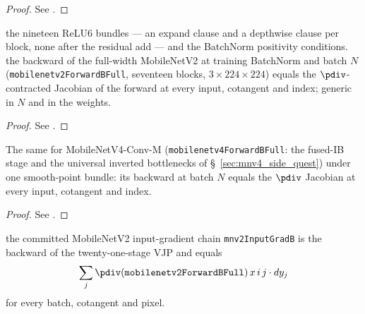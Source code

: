 \begin{proof}
\leanok
See .
\end{proof}

\begin{theorem}
  \label{thm:mobilenetv2FullHasVJP}
  \leanok
  \Assume{} the nineteen ReLU6 bundles --- an expand clause and a depthwise
  clause per block, none after the residual add --- and the BatchNorm
  positivity conditions. \Prove{} the backward of the full-width MobileNetV2
  at training BatchNorm and batch \(N\) (\texttt{mobilenetv2ForwardBFull},
  seventeen blocks, \(3 \times 224 \times 224\)) equals the
  \(\pdiv\)-contracted Jacobian of the forward at every input, cotangent and
  index; generic in \(N\) and in the weights.
\end{theorem}

\begin{proof}
\leanok
See .
\end{proof}

\begin{theorem}
  \label{thm:mobilenetv4FullHasVJP}
  \leanok
  The same for MobileNetV4-Conv-M (\texttt{mobilenetv4ForwardBFull}: the
  fused-IB stage and the universal inverted bottlenecks of
  \S~\ref{sec:mnv4_side_quest}) under one smooth-point bundle: \Prove{} its
  backward at batch \(N\) equals the \(\pdiv\) Jacobian at every input,
  cotangent and index.
\end{theorem}

\begin{proof}
\leanok
See .
\end{proof}

\begin{theorem}
  \label{thm:mobilenetv2_whole_back}
  \leanok
  \Prove{} the committed MobileNetV2 input-gradient chain
  \texttt{mnv2InputGradB} is the backward of the twenty-one-stage VJP and
  equals
  \[
    \sum_j \pdiv(\texttt{mobilenetv2ForwardBFull})\, x\, i\, j \cdot
  dy_j
  \]
  for every batch, cotangent and pixel.
\end{theorem}

